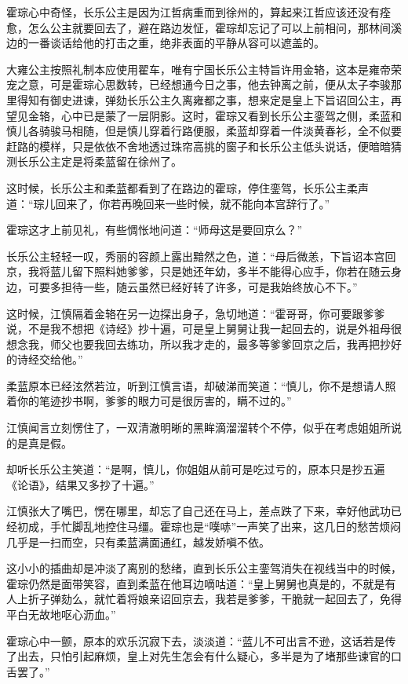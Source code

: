 霍琮心中奇怪，长乐公主是因为江哲病重而到徐州的，算起来江哲应该还没有痊愈，怎么公主就要回去了，避在路边发怔，霍琮却忘记了可以上前相问，那林间溪边的一番谈话给他的打击之重，绝非表面的平静从容可以遮盖的。

大雍公主按照礼制本应使用翟车，唯有宁国长乐公主特旨许用金辂，这本是雍帝荣宠之意，可是霍琮心思数转，已经想通今日之事，他去钟离之前，便从太子李骏那里得知有御史进谏，弹劾长乐公主久离雍都之事，想来定是皇上下旨诏回公主，再望见金辂，心中已是蒙了一层阴影。这时，霍琮又看到长乐公主銮驾之侧，柔蓝和慎儿各骑骏马相随，但是慎儿穿着行路便服，柔蓝却穿着一件淡黄春衫，全不似要赶路的模样，只是依依不舍地透过珠帘高挑的窗子和长乐公主低头说话，便暗暗猜测长乐公主定是将柔蓝留在徐州了。

这时候，长乐公主和柔蓝都看到了在路边的霍琮，停住銮驾，长乐公主柔声道：“琮儿回来了，你若再晚回来一些时候，就不能向本宫辞行了。”

霍琮这才上前见礼，有些惆怅地问道：“师母这是要回京么？”

长乐公主轻轻一叹，秀丽的容颜上露出黯然之色，道：“母后微恙，下旨诏本宫回京，我将蓝儿留下照料她爹爹，只是她还年幼，多半不能得心应手，你若在随云身边，可要多担待一些，随云虽然已经好转了许多，可是我始终放心不下。”

这时候，江慎隔着金辂在另一边探出身子，急切地道：“霍哥哥，你可要跟爹爹说，不是我不想把《诗经》抄十遍，可是皇上舅舅让我一起回去的，说是外祖母很想念我，师父也要我回去练功，所以我才走的，最多等爹爹回京之后，我再把抄好的诗经交给他。”

柔蓝原本已经泫然若泣，听到江慎言语，却破涕而笑道：“慎儿，你不是想请人照着你的笔迹抄书啊，爹爹的眼力可是很厉害的，瞒不过的。”

江慎闻言立刻愣住了，一双清澈明晰的黑眸滴溜溜转个不停，似乎在考虑姐姐所说的是真是假。

却听长乐公主笑道：“是啊，慎儿，你姐姐从前可是吃过亏的，原本只是抄五遍《论语》，结果又多抄了十遍。”

江慎张大了嘴巴，愣在哪里，却忘了自己还在马上，差点跌了下来，幸好他武功已经初成，手忙脚乱地控住马缰。霍琮也是“噗哧”一声笑了出来，这几日的愁苦烦闷几乎是一扫而空，只有柔蓝满面通红，越发娇嗔不依。

这小小的插曲却是冲淡了离别的愁绪，直到长乐公主銮驾消失在视线当中的时候，霍琮仍然是面带笑容，直到柔蓝在他耳边嘀咕道：“皇上舅舅也真是的，不就是有人上折子弹劾么，就忙着将娘亲诏回京去，我若是爹爹，干脆就一起回去了，免得平白无故地呕心沥血。”

霍琮心中一颤，原本的欢乐沉寂下去，淡淡道：“蓝儿不可出言不逊，这话若是传了出去，只怕引起麻烦，皇上对先生怎会有什么疑心，多半是为了堵那些谏官的口舌罢了。”

